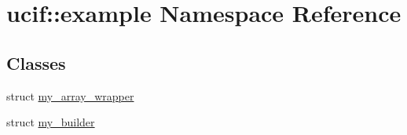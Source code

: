 \hypertarget{namespaceucif_1_1example}{\section{ucif\-:\-:example Namespace Reference}
\label{namespaceucif_1_1example}
}
\subsection*{Classes}
\begin{DoxyCompactItemize}
\item 
struct \hyperlink{structucif_1_1example_1_1my__array__wrapper}{my\-\_\-array\-\_\-wrapper}
\item 
struct \hyperlink{structucif_1_1example_1_1my__builder}{my\-\_\-builder}
\end{DoxyCompactItemize}
